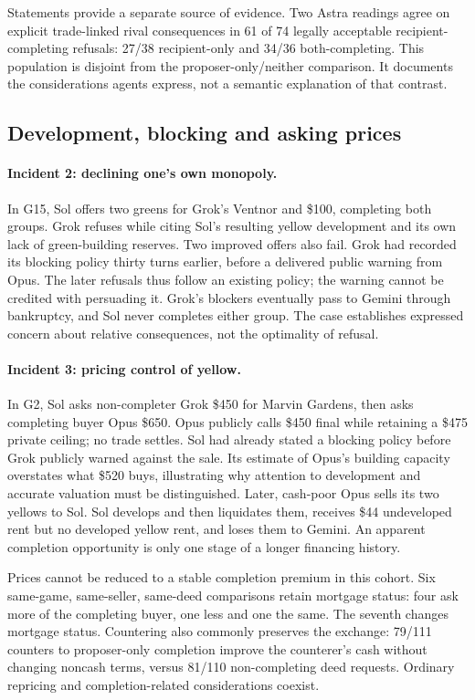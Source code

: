 Statements provide a separate source of evidence. Two Astra readings agree on explicit trade-linked rival consequences in 61 of 74 legally acceptable recipient-completing refusals: 27/38 recipient-only and 34/36 both-completing. This population is disjoint from the proposer-only/neither comparison. It documents the considerations agents express, not a semantic explanation of that contrast.

\subsection{Development, blocking and asking prices}
\paragraph{Incident 2: declining one's own monopoly.}
In G15, Sol offers two greens for Grok's Ventnor and \$100, completing both groups. Grok refuses while citing Sol's resulting yellow development and its own lack of green-building reserves. Two improved offers also fail. Grok had recorded its blocking policy thirty turns earlier, before a delivered public warning from Opus. The later refusals thus follow an existing policy; the warning cannot be credited with persuading it. Grok's blockers eventually pass to Gemini through bankruptcy, and Sol never completes either group. The case establishes expressed concern about relative consequences, not the optimality of refusal.

\paragraph{Incident 3: pricing control of yellow.}
In G2, Sol asks non-completer Grok \$450 for Marvin Gardens, then asks completing buyer Opus \$650. Opus publicly calls \$450 final while retaining a \$475 private ceiling; no trade settles. Sol had already stated a blocking policy before Grok publicly warned against the sale. Its estimate of Opus's building capacity overstates what \$520 buys, illustrating why attention to development and accurate valuation must be distinguished. Later, cash-poor Opus sells its two yellows to Sol. Sol develops and then liquidates them, receives \$44 undeveloped rent but no developed yellow rent, and loses them to Gemini. An apparent completion opportunity is only one stage of a longer financing history.

Prices cannot be reduced to a stable completion premium in this cohort. Six same-game, same-seller, same-deed comparisons retain mortgage status: four ask more of the completing buyer, one less and one the same. The seventh changes mortgage status. Countering also commonly preserves the exchange: 79/111 counters to proposer-only completion improve the counterer's cash without changing noncash terms, versus 81/110 non-completing deed requests. Ordinary repricing and completion-related considerations coexist.


